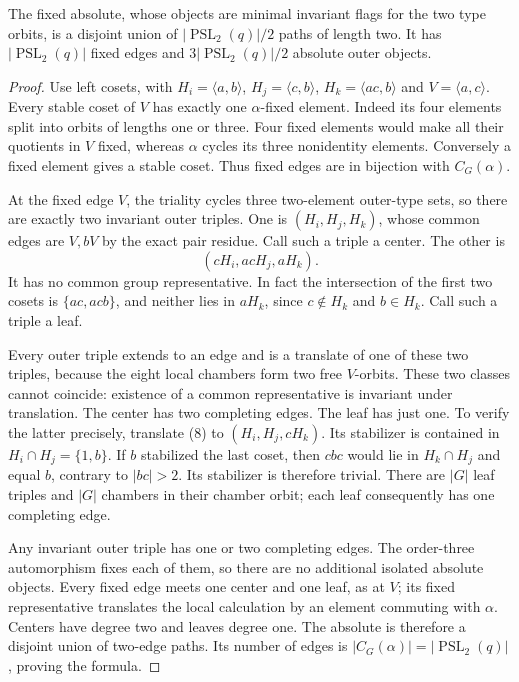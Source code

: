 \documentclass[11pt,a4paper]{article}
\newcommand{\gen}[1]{\langle #1\rangle}
\newcommand{\PSL}{\operatorname{PSL}}
\begin{document}
\begin{theorem}\label{fixed}
The fixed absolute, whose objects are minimal invariant flags for the two
type orbits, is a disjoint union of $|\PSL_2(q)|/2$ paths of length two.
It has $|\PSL_2(q)|$ fixed edges and $3|\PSL_2(q)|/2$ absolute outer objects.
\end{theorem}
\begin{proof}
Use left cosets, with $H_i=\gen{a,b}$, $H_j=\gen{c,b}$,
$H_k=\gen{ac,b}$ and $V=\gen{a,c}$. Every stable coset of $V$ has exactly
one $\alpha$-fixed element. Indeed its four elements split into orbits
of lengths one or three. Four fixed elements would make all their quotients
in $V$ fixed, whereas $\alpha$ cycles its three nonidentity elements.
Conversely a fixed element gives a stable coset. Thus fixed edges are
in bijection with $C_G(\alpha)$.

At the fixed edge $V$, the triality cycles three two-element outer-type
sets, so there are exactly two invariant outer triples. One is
$(H_i,H_j,H_k)$, whose common edges are $V,bV$ by the exact pair residue.
Call such a triple a center. The other is
\[
                         (cH_i,acH_j,aH_k).               \tag{8}
\]
It has no common group representative. In fact the intersection of the
first two cosets is $\{ac,acb\}$, and neither lies in $aH_k$, since
$c\notin H_k$ and $b\in H_k$. Call such a triple a leaf.

Every outer triple extends to an edge and is a translate of one of these
two triples, because the eight local chambers form two free $V$-orbits.
These two classes cannot coincide: existence of a common representative
is invariant under translation. The center has two completing edges.
The leaf has just one. To verify the latter precisely, translate (8) to
$(H_i,H_j,cH_k)$. Its stabilizer is contained in $H_i\cap H_j=\{1,b\}$.
If $b$ stabilized the last coset, then $cbc$ would lie in $H_k\cap H_j$
and equal $b$, contrary to $|bc|>2$. Its stabilizer is therefore trivial.
There are $|G|$ leaf triples and $|G|$ chambers in their chamber orbit;
each leaf consequently has one completing edge.

Any invariant outer triple has one or two completing edges. The order-three
automorphism fixes each of them, so there are no additional isolated
absolute objects. Every fixed edge meets one center and one leaf, as at
$V$; its fixed representative translates the local calculation by an
element commuting with $\alpha$. Centers have degree two and leaves
degree one. The absolute is therefore a disjoint union of two-edge paths.
Its number of edges is $|C_G(\alpha)|=|\PSL_2(q)|$, proving the formula.
\end{proof}
\end{document}
